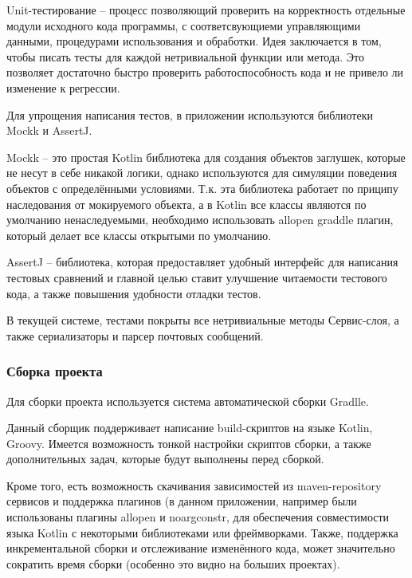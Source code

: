 Unit-тестирование – процесс позволяющий проверить на корректность отдельные модули исходного кода программы, 
с соответсвующиеми управляющими данными, процедурами использования и обработки. Идея заключается в том, 
чтобы писать тесты для каждой нетривиальной функции или метода. Это позволяет достаточно быстро проверить работоспособность кода и не привело ли изменение к регрессии.

Для упрощения написания тестов, в приложении используются библиотеки Mockk и AssertJ.

Mockk – это простая Kotlin библиотека для создания объектов заглушек, которые не несут в себе никакой логики, 
однако используются для симуляции поведения объектов с определёнными условиями. Т.к. эта библиотека работает по приципу наследования от мокируемого объекта, 
а в Kotlin все классы являются по умолчанию ненаследуемыми, необходимо использовать allopen graddle плагин, который делает все классы открытыми по умолчанию.

AssertJ – библиотека, которая предоставляет удобный интерфейс для написания тестовых сравнений и главной целью ставит улучшение читаемости тестового кода, 
а также повышения удобности отладки тестов.

В текущей системе, тестами покрыты все нетривиальные методы Сервис-слоя, а также сериализаторы и парсер почтовых сообщений.


\subsubsection{Сборка проекта}\indent

Для сборки проекта используется система автоматической сборки Gradlle.

Данный сборщик поддерживает написание build-скриптов на языке Kotlin, Groovy. Имеется возможность тонкой настройки скриптов сборки, 
а также дополнительных задач, которые будут выполнены перед сборкой.

Кроме того, есть возможность скачивания зависимостей из maven-repository сервисов и поддержка плагинов (в данном приложении, 
например были использованы плагины allopen и noargconstr, для обеспечения совместимости языка Kotlin с некоторыми библиотеками или фреймворками. 
Также, поддержка инкрементальной сборки и отслеживание изменённого кода, может значительно сократить время сборки (особенно это видно на больших проектах).
